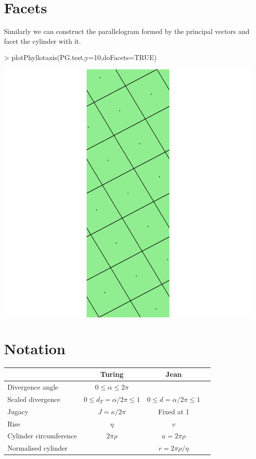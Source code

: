 \documentclass[a4paper]{article}
\begin{document}
\section{Facets}
Similarly we can construct the parallelogram formed by the principal vectors and facet the cylinder with it.
\begin{Schunk}
\begin{Sinput}
> plotPhyllotaxis(PG.test,y=10,doFacets=TRUE)
\end{Sinput}
\end{Schunk}
\includegraphics{figdir/fig-042}



\section{Notation}



\begin{tabular}{lccc}
& Turing\cite[p54]{turing:1952} &  Jean\cite{jean:1994} & \cite{abop:1991} \\
\hline
Divergence angle & $0 \leq \alpha \leq 2\pi $\\

Scaled divergence & $0 \leq d_T=\alpha/2\pi \leq 1$ & $0 \leq d=\alpha/2\pi \leq 1$ & \\
Jugacy & $J=\kappa/2\pi$ & Fixed at 1 & \\
Rise & $\eta$ & $v$ & \\
Cylinder circumference &$2\pi\rho$& $u=2\pi\rho$ & \\
Normalised cylinder && $r=2\pi\rho/\eta$\\
\end{tabular}

\end{document}
